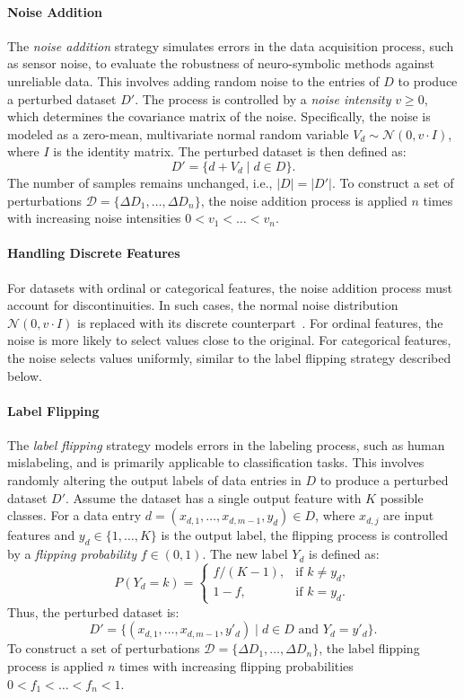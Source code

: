 %
\paragraph{Noise Addition}
%
The \emph{noise addition} strategy simulates errors in the data acquisition process, such as sensor noise, to evaluate the robustness of neuro-symbolic methods against unreliable data.
%
This involves adding random noise to the entries of \(D\) to produce a perturbed dataset \(D'\).
%
The process is controlled by a \emph{noise intensity} \(v \geq 0\), which determines the covariance matrix of the noise.
%
Specifically, the noise is modeled as a zero-mean, multivariate normal random variable \(V_d \sim \mathcal{N}(0, v \cdot I)\), where \(I\) is the identity matrix.
%
The perturbed dataset is then defined as:
%
\[
D' = \{d + V_d \mid d \in D\}.
\]
%
The number of samples remains unchanged, i.e., \(|D| = |D'|\).
%
To construct a set of perturbations \(\mathcal{D} = \{\Delta D_1, \ldots, \Delta D_n\}\), the noise addition process is applied \(n\) times with increasing noise intensities \(0 < v_1 < \ldots < v_n\).

%
\paragraph{Handling Discrete Features}
%
For datasets with ordinal or categorical features, the noise addition process must account for discontinuities.
%
In such cases, the normal noise distribution \(\mathcal{N}(0, v \cdot I)\) is replaced with its discrete counterpart~\cite{KairouzIcml2021}.
%
For ordinal features, the noise is more likely to select values close to the original.
%
For categorical features, the noise selects values uniformly, similar to the label flipping strategy described below.

%
\paragraph{Label Flipping}
%
The \emph{label flipping} strategy models errors in the labeling process, such as human mislabeling, and is primarily applicable to classification tasks.
%
This involves randomly altering the output labels of data entries in \(D\) to produce a perturbed dataset \(D'\).
%
Assume the dataset has a single output feature with \(K\) possible classes.
%
For a data entry \(d = (x_{d,1}, \ldots, x_{d,m-1}, y_d) \in D\), where \(x_{d,j}\) are input features and \(y_d \in \{1, \ldots, K\}\) is the output label, the flipping process is controlled by a \emph{flipping probability} \(f \in (0, 1)\).
%
The new label \(Y_d\) is defined as:
%
\[
P(Y_d = k) =
\begin{cases}
f / (K - 1), & \text{if } k \neq y_d, \\
1 - f, & \text{if } k = y_d.
\end{cases}
\]
%
Thus, the perturbed dataset is:
%
\[
D' = \{(x_{d,1}, \ldots, x_{d,m-1}, y'_d) \mid d \in D \text{ and } Y_d = y'_d\}.
\]
%
To construct a set of perturbations \(\mathcal{D} = \{\Delta D_1, \ldots, \Delta D_n\}\), the label flipping process is applied \(n\) times with increasing flipping probabilities \(0 < f_1 < \ldots < f_n < 1\).

